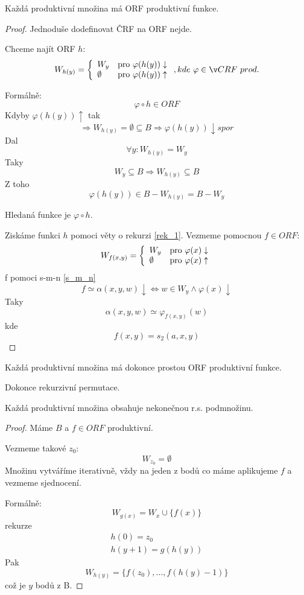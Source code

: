 \begin{theorem}
	Každá produktivní množina má ORF produktivní funkce.
\end{theorem}
\begin{proof}
	Jednoduše dodefinovat ČRF na ORF nejde.

	Chceme najít ORF $h$:
	\[ W_{h(y)} = \twopartdef { W_y } { \varphi(h(y)) \downarrow } { \emptyset } { \varphi(h(y)) \uparrow }, kde\ \varphi \in ČRF\ prod. \]

	Formálně:
	\[ \varphi \circ h \in ORF \]
	Kdyby $\varphi(h(y)) \uparrow$ tak
	\[ \Rightarrow W_{h(y)} = \emptyset \subseteq B \Rightarrow \varphi(h(y)) \downarrow spor \]
	Dal
	\[ \forall y: W_{h(y)} = W_y \]
	Taky
	\[ W_y \subseteq B \Rightarrow W_{h(y)} \subseteq B \]
	Z toho
	\[ \varphi(h(y)) \in B - W_{h(y)} = B - W_y \]

	Hledaná funkce je $\varphi \circ h$.

	Ziskáme funkci $h$ pomoci věty o rekurzi \cref{rek_1}.
	Vezmeme pomocnou $f \in ORF$:
	\[ W_{f(x, y)} = \left\{ \begin{array}{ll}  W_y  & \mbox{pro }  \varphi(x) \downarrow  \\  \emptyset  & \mbox{pro }  \varphi(x) \uparrow  \end{array} \right. \]
	f pomoci s-m-n \cref{s_m_n}
	\[ f \simeq \alpha(x, y, w) \downarrow \iff w \in W_y \land \varphi(x) \downarrow \]
	Taky
	\[ \alpha(x, y, w) \simeq \varphi_{f(x, y)} (w) \]
	kde
	\[ f(x, y) = s_2(a, x, y) \]
\end{proof}

\begin{theorem}
	Každá produktivní množina má dokonce prostou ORF produktivní funkce.

	Dokonce rekurzivní permutace.
\end{theorem}

\begin{theorem}\label{product_inf}
	Každá produktivní množina obsahuje nekonečnou r.s. podmnožinu.
\end{theorem}
\begin{proof}
	Máme $B$ a $f \in ORF$ produktivní.

	Vezmeme takové $z_0$:
	\[ W_{z_0} = \emptyset \]
	Množinu vytváříme iterativně, vždy na jeden z bodů co máme aplikujeme $f$ a vezmeme sjednocení.

	Formálně:
	\[ W_{g(x)} = W_x \cup \{ f(x) \} \]
	rekurze
	\begin{align}
		h(0) = z_0\\
		h(y + 1) = g(h(y))
	\end{align}
	Pak
	\[ W_{h(y)} = \{ f(z_0), \ldots, f(h(y) - 1) \} \]
	což je $y$ bodů z B.
\end{proof}

